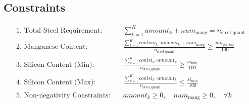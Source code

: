 \documentclass{article}
\begin{document}
\subsection*{Constraints}

\begin{align}
\text{1. Total Steel Requirement:} & \quad \sum_{k=1}^{K} amount_k + num_{\text{mang}} = n_{\text{steel\_quant}} \\
\text{2. Manganese Content:} & \quad \frac{\sum_{k=1}^{K} contmn_k \cdot amount_k + num_{\text{mang}}}{n_{\text{steel\_quant}}} \geq \frac{mn_{\text{percent}}}{100} \\
\text{3. Silicon Content (Min):} & \quad \frac{\sum_{k=1}^{K} contsi_k \cdot amount_k}{n_{\text{steel\_quant}}} \geq \frac{si_{\text{min}}}{100} \\
\text{4. Silicon Content (Max):} & \quad \frac{\sum_{k=1}^{K} contsi_k \cdot amount_k}{n_{\text{steel\_quant}}} \leq \frac{si_{\text{max}}}{100} \\
\text{5. Non-negativity Constraints:} & \quad amount_k \geq 0, \quad num_{\text{mang}} \geq 0, \quad \forall k
\end{align}
\end{document}
